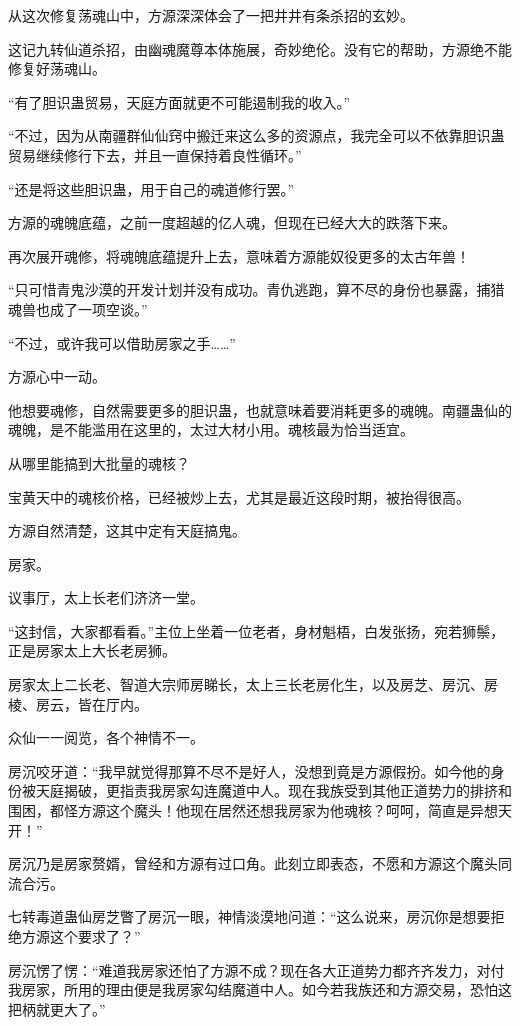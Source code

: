 \begin{this_body}
从这次修复荡魂山中，方源深深体会了一把井井有条杀招的玄妙。

这记九转仙道杀招，由幽魂魔尊本体施展，奇妙绝伦。没有它的帮助，方源绝不能修复好荡魂山。

“有了胆识蛊贸易，天庭方面就更不可能遏制我的收入。”

“不过，因为从南疆群仙仙窍中搬迁来这么多的资源点，我完全可以不依靠胆识蛊贸易继续修行下去，并且一直保持着良性循环。”

“还是将这些胆识蛊，用于自己的魂道修行罢。”

方源的魂魄底蕴，之前一度超越的亿人魂，但现在已经大大的跌落下来。

再次展开魂修，将魂魄底蕴提升上去，意味着方源能奴役更多的太古年兽！

“只可惜青鬼沙漠的开发计划并没有成功。青仇逃跑，算不尽的身份也暴露，捕猎魂兽也成了一项空谈。”

“不过，或许我可以借助房家之手……”

方源心中一动。

他想要魂修，自然需要更多的胆识蛊，也就意味着要消耗更多的魂魄。南疆蛊仙的魂魄，是不能滥用在这里的，太过大材小用。魂核最为恰当适宜。

从哪里能搞到大批量的魂核？

宝黄天中的魂核价格，已经被炒上去，尤其是最近这段时期，被抬得很高。

方源自然清楚，这其中定有天庭搞鬼。

房家。

议事厅，太上长老们济济一堂。

“这封信，大家都看看。”主位上坐着一位老者，身材魁梧，白发张扬，宛若狮鬃，正是房家太上大长老房狮。

房家太上二长老、智道大宗师房睇长，太上三长老房化生，以及房芝、房沉、房棱、房云，皆在厅内。

众仙一一阅览，各个神情不一。

房沉咬牙道：“我早就觉得那算不尽不是好人，没想到竟是方源假扮。如今他的身份被天庭揭破，更指责我房家勾连魔道中人。现在我族受到其他正道势力的排挤和围困，都怪方源这个魔头！他现在居然还想我房家为他魂核？呵呵，简直是异想天开！”

房沉乃是房家赘婿，曾经和方源有过口角。此刻立即表态，不愿和方源这个魔头同流合污。

七转毒道蛊仙房芝瞥了房沉一眼，神情淡漠地问道：“这么说来，房沉你是想要拒绝方源这个要求了？”

房沉愣了愣：“难道我房家还怕了方源不成？现在各大正道势力都齐齐发力，对付我房家，所用的理由便是我房家勾结魔道中人。如今若我族还和方源交易，恐怕这把柄就更大了。”


\end{this_body}
